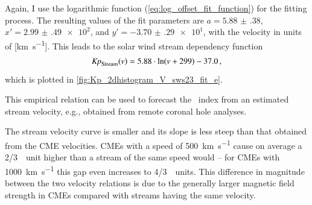 Again, I use the logarithmic function (\ref{eq:log_offset_fit_function}) for the fitting process. The resulting values of the fit parameters are \mbox{$a = \num{5.88(38)}$}, $x' = \num{2.99(49)e2}$, and $y' = \num{-3.70(29)e1}$, with the velocity in units of [\si{\km\per\s}].
This leads to the solar wind stream dependency function
\begin{align}
	\text{\textit{Kp}}_\text{Stream}(v) = 5.88 \cdot \ln(v + 299) - 37.0	\,,	\label{eq:kpvsv_stream_dependency_function}
\end{align}
which is plotted in \autoref{fig:Kp_2dhistogram_V_sws23_fit_e}.
\begin{figure}
\end{figure}
This empirical relation can be used to forecast the \Kp{}~index from an estimated stream velocity, e.g., obtained from remote coronal hole analyses.

The stream velocity curve is smaller and its slope is less steep than that obtained from the CME velocities. CMEs with a speed of \SI{500}{\km\per\s} cause on average a 2/3~\Kp~unit higher \Kp{} than a stream of the same speed would -- for CMEs with \SI{1000}{\km\per\s} this gap even increases to 4/3~\Kp~units. This difference in \Kp{} magnitude between the two velocity relations is due to the generally larger magnetic field strength in CMEs compared with streams having the same velocity.


